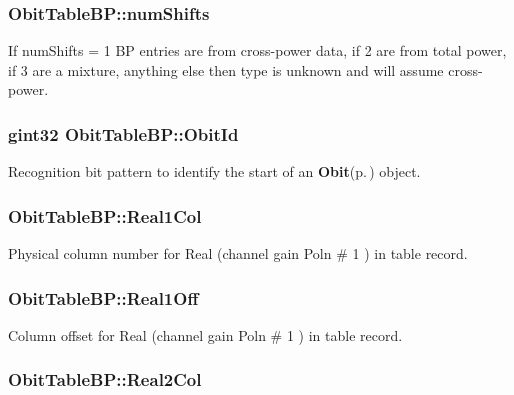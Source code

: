 \subsubsection{ {\bf Obit\-Table\-BP::num\-Shifts}}\label{structObitTableBP_o20}


If num\-Shifts = 1 BP entries are from cross-power data, if 2 are from total power, if 3 are a mixture, anything else then type is unknown and will assume cross-power. 

\subsubsection{\setlength{\rightskip}{0pt plus 5cm}gint32 {\bf Obit\-Table\-BP::Obit\-Id}}\label{structObitTableBP_o0}


Recognition bit pattern to identify the start of an {\bf Obit}{\rm (p.\,\pageref{structObit})} object. 

\subsubsection{ {\bf Obit\-Table\-BP::Real1Col}}\label{structObitTableBP_o45}


Physical column number for Real (channel gain Poln \# 1 ) in table record. 

\subsubsection{ {\bf Obit\-Table\-BP::Real1Off}}\label{structObitTableBP_o44}


Column offset for Real (channel gain Poln \# 1 ) in table record. 

\subsubsection{ {\bf Obit\-Table\-BP::Real2Col}}\label{structObitTableBP_o53}


